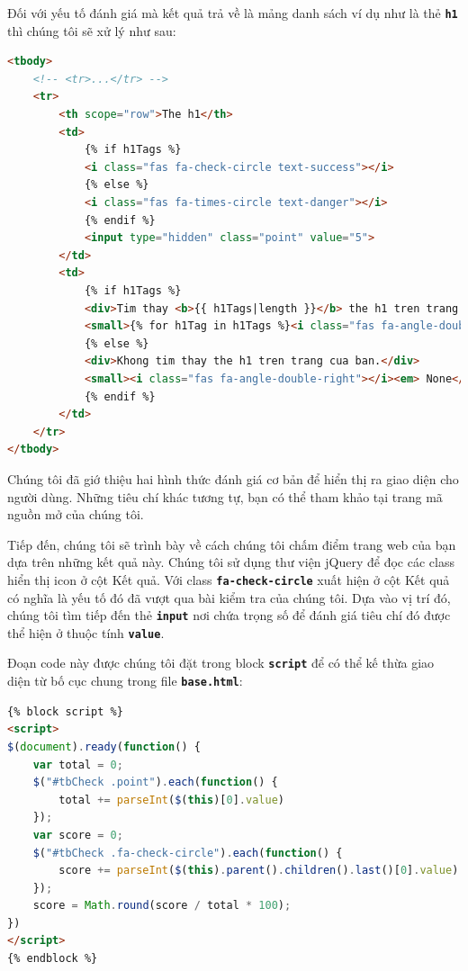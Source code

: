 \par
Đối với yếu tố đánh giá mà kết quả trả về là mảng danh sách ví dụ như là thẻ \textbf{\texttt{h1}} thì chúng tôi sẽ xử lý như sau:
\begin{lstlisting}[language=html]
<tbody>
    <!-- <tr>...</tr> -->
    <tr>
        <th scope="row">The h1</th>
        <td>
            {% if h1Tags %}
            <i class="fas fa-check-circle text-success"></i>
            {% else %}
            <i class="fas fa-times-circle text-danger"></i>
            {% endif %}
            <input type="hidden" class="point" value="5">
        </td>
        <td>
            {% if h1Tags %}
            <div>Tim thay <b>{{ h1Tags|length }}</b> the h1 tren trang cua ban.</div>
            <small>{% for h1Tag in h1Tags %}<i class="fas fa-angle-double-right"></i> {{ h1Tag }}<br>{% endfor %}</small>
            {% else %}
            <div>Khong tim thay the h1 tren trang cua ban.</div>
            <small><i class="fas fa-angle-double-right"></i><em> None</em></small>
            {% endif %}
        </td>
    </tr>
</tbody>
\end{lstlisting}
\par
Chúng tôi đã giớ thiệu hai hình thức đánh giá cơ bản để hiển thị ra giao diện cho người dùng. Những tiêu chí khác tương tự, bạn có thể tham khảo tại trang mã nguồn mở của chúng tôi.
\par
Tiếp đến, chúng tôi sẽ trình bày về cách chúng tôi chấm điểm trang web của bạn dựa trên những kết quả này. Chúng tôi sử dụng thư viện jQuery để đọc các class hiển thị icon ở cột Kết quả. Với class \textbf{\texttt{fa-check-circle}} xuất hiện ở cột Kết quả có nghĩa là yếu tố đó đã vượt qua bài kiểm tra của chúng tôi. Dựa vào vị trí đó, chúng tôi tìm tiếp đến thẻ \textbf{\texttt{input}} nơi chứa trọng số để đánh giá tiêu chí đó được thể hiện ở thuộc tính \textbf{\texttt{value}}.
\par
Đoạn code này được chúng tôi đặt trong block \textbf{\texttt{script}} để có thể kế thừa giao diện từ bố cục chung trong file \textbf{\texttt{base.html}}:
\begin{lstlisting}[language=html]
{% block script %}
<script>
$(document).ready(function() {
    var total = 0;
    $("#tbCheck .point").each(function() {
        total += parseInt($(this)[0].value)
    });
    var score = 0;
    $("#tbCheck .fa-check-circle").each(function() {
        score += parseInt($(this).parent().children().last()[0].value)
    });
    score = Math.round(score / total * 100);
})
</script>
{% endblock %}
\end{lstlisting}
